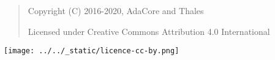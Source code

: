 \bigskip
\begin{quote}
   Copyright (C) 2016-2020, AdaCore and Thales

   Licensed under Creative Commons Attribution 4.0 International
\end{quote}

\texttt{[image: ../../\_static/licence-cc-by.png]}
\bigskip
